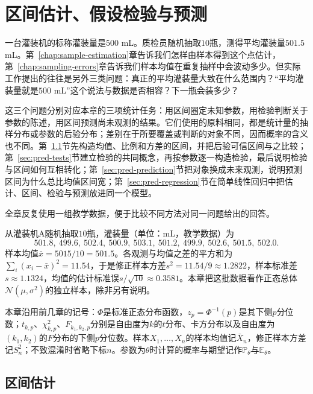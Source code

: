 \chapter{区间估计、假设检验与预测}
\label{chap:intervals-tests-prediction}

一台灌装机的标称灌装量是$500$ mL。质检员随机抽取$10$瓶，测得平均灌装量$501.5$ mL。第~\ref{chap:sample-estimation}章告诉我们怎样由样本得到这个点估计，第~\ref{chap:sampling-errors}章告诉我们样本均值在重复抽样中会波动多少。但实际工作提出的往往是另外三类问题：真正的平均灌装量大致在什么范围内？“平均灌装量就是$500$ mL”这个说法与数据是否相容？下一瓶会装多少？

这三个问题分别对应本章的三项统计任务：用区间圈定未知参数，用检验判断关于参数的陈述，用区间预测尚未观测的结果。它们使用的原料相同，都是统计量的抽样分布或参数的后验分布；差别在于所要覆盖或判断的对象不同，因而概率的含义也不同。第~\ref{sec:pred-intervals}节先构造均值、比例和方差的区间，并把后验可信区间与之比较；第~\ref{sec:pred-tests}节建立检验的共同概念，再按参数逐一构造检验，最后说明检验与区间如何互相转化；第~\ref{sec:pred-prediction}节把对象换成未来观测，说明预测区间为什么总比均值区间宽；第~\ref{sec:pred-regression}节在简单线性回归中把估计、区间、检验与预测放进同一个模型。

全章反复使用一组教学数据，便于比较不同方法对同一问题给出的回答。

\begin{example}[灌装量数据]
\label{ex:pred-filling-data}
从灌装机A随机抽取$10$瓶，灌装量（单位：mL，教学数据）为
\[
 501.8,\ 499.6,\ 502.4,\ 500.9,\ 503.1,\ 501.2,\ 499.9,\ 502.6,\ 501.5,\ 502.0.
\]
样本均值$\bar x=5015/10=501.5$。各观测与均值之差的平方和为$\sum_i(x_i-\bar x)^2=11.54$，于是修正样本方差$s^2=11.54/9\approx1.2822$，样本标准差$s\approx1.1324$，均值的估计标准误$s/\sqrt{10}\approx0.3581$。本章把这批数据看作正态总体$\mathcal N(\mu,\sigma^2)$的独立样本，除非另有说明。
\end{example}

本章沿用前几章的记号：$\Phi$是标准正态分布函数，$z_p=\Phi^{-1}(p)$是其下侧$p$分位数；$t_{k,p}$、$\chi^2_{k,p}$、$F_{k_1,k_2,p}$分别是自由度为$k$的$t$分布、卡方分布以及自由度为$(k_1,k_2)$的$F$分布的下侧$p$分位数。样本$X_1,\dots,X_n$的样本均值记$\bar X_n$，修正样本方差记$S_n^2$；不致混淆时省略下标$n$。参数为$\theta$时计算的概率与期望记作$\mathbb P_\theta$与$\mathbb E_\theta$。

\section{区间估计}
\label{sec:pred-intervals}

